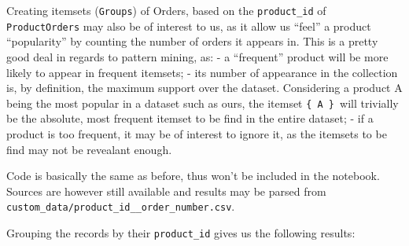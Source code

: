 \documentclass[11pt]{article}
\begin{document}
Creating itemsets (\texttt{Groups}) of Orders, based on the
\texttt{product\_id} of \texttt{ProductOrders} may also be of interest
to us, as it allow us ``feel'' a product ``popularity'' by counting the
number of orders it appears in. This is a pretty good deal in regards to
pattern mining, as: - a ``frequent'' product will be more likely to
appear in frequent itemsets; - its number of appearance in the
collection is, by definition, the maximum support over the dataset.
Considering a product A being the most popular in a dataset such as
ours, the itemset \texttt{\{\ A\ \}}~will trivially be the absolute,
most frequent itemset to be find in the entire dataset; - if a product
is too frequent, it may be of interest to ignore it, as the itemsets to
be find may not be revealant enough.

    Code is basically the same as before, thus won't be included in the
notebook. Sources are however still available and results may be parsed
from \texttt{custom\_data/product\_id\_\_order\_number.csv}.

Grouping the records by their \texttt{product\_id} gives us the
following results:
\end{document}
